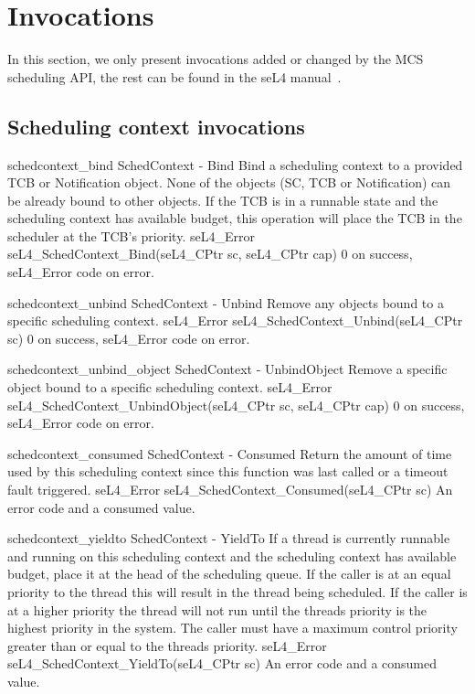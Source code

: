 \section{Invocations}

In this section, we only present invocations added or changed by the MCS scheduling API, the rest
can be found in the seL4 manual~\citep{seL417}. 

\subsection{Scheduling context invocations}
\label{api:sc}
\apidoc
{schedcontext_bind}
{SchedContext - Bind}
{ Bind a scheduling context to a provided TCB or Notification object. None of the objects (SC, TCB
or Notification) can be already bound to other objects. If the TCB is in a runnable state and the
scheduling context has available budget, this operation will place the TCB in the scheduler at the
TCB's priority.}
{seL4\_Error seL4\_SchedContext\_Bind(seL4\_CPtr sc, seL4\_CPtr cap)}
{
}
{0 on success, seL4\_Error code on error.}

\apidoc
{schedcontext_unbind}
{SchedContext - Unbind}
{ Remove any objects bound to a specific scheduling context.}
{seL4\_Error seL4\_SchedContext\_Unbind(seL4\_CPtr sc)}
{
}
{0 on success, seL4\_Error code on error.}

\apidoc
{schedcontext_unbind_object}
{SchedContext - UnbindObject}
{ Remove a specific object bound to a specific scheduling context.}
{seL4\_Error seL4\_SchedContext\_UnbindObject(seL4\_CPtr sc, seL4\_CPtr cap)}
{
}
{0 on success, seL4\_Error code on error.}

\apidoc
{schedcontext_consumed}
{SchedContext - Consumed}
{ Return the amount of time used by this scheduling context since this function
    was last called or a timeout fault triggered.}
    {seL4\_Error seL4\_SchedContext\_Consumed(seL4\_CPtr sc)}
{
}
{An error code and a  consumed value.}

\apidoc
{schedcontext_yieldto}
{SchedContext - YieldTo}
{ 
   If a thread is currently runnable and running on this scheduling context and the scheduling context has available budget, place it at the head of the scheduling queue.
              If the caller is at an equal priority to the thread this will result in the thread being scheduled.
              If the caller is at a higher priority the thread will not run until the threads priority is the highest priority in the system.
              The caller must have a maximum control priority greater than or equal to the threads priority.
}
{seL4\_Error seL4\_SchedContext\_YieldTo(seL4\_CPtr sc)}
{
}
{An error code and a  consumed value.}

